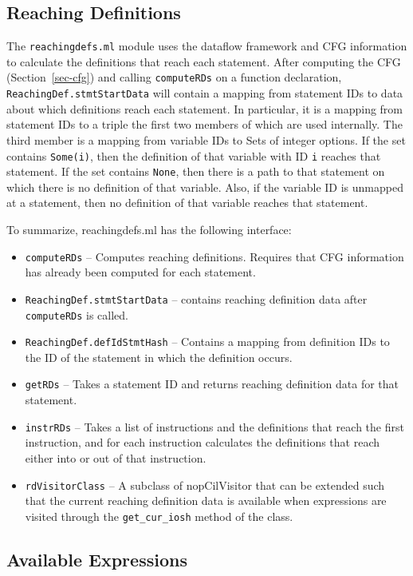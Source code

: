\documentclass{article}
\def\secref#1{Section~\ref{sec-#1}}
\def\t#1{{\tt #1}}
\begin{document}
\subsection{Reaching Definitions}

The \t{reachingdefs.ml} module uses the dataflow framework and CFG
information to calculate the definitions that reach each
statement. After computing the CFG (\secref{cfg}) and calling
\t{computeRDs} on a 
function declaration, \t{ReachingDef.stmtStartData} will contain a
mapping from statement IDs to data about which definitions reach each
statement. In particular, it is a mapping from statement IDs to a
triple the first two members of which are used internally. The third
member is a mapping from variable IDs to Sets of integer options. If
the set contains \t{Some(i)}, then the definition of that variable
with ID \t{i} reaches that statement. If the set contains \t{None},
then there is a path to that statement on which there is no definition
of that variable.  Also, if the variable ID is unmapped at a
statement, then no definition of that variable reaches that statement.

To summarize, reachingdefs.ml has the following interface:
\begin{itemize}
\item \t{computeRDs} -- Computes reaching definitions. Requires that
CFG information has already been computed for each statement.
\item \t{ReachingDef.stmtStartData} -- contains reaching
definition data after \t{computeRDs} is called.
\item \t{ReachingDef.defIdStmtHash} -- Contains a mapping
from definition IDs to the ID of the statement in which
the definition occurs.
\item \t{getRDs} -- Takes a statement ID and returns
reaching definition data for that statement.
\item \t{instrRDs} -- Takes a list of instructions and the
definitions that reach the first instruction, and for
each instruction calculates the definitions that reach
either into or out of that instruction.
\item \t{rdVisitorClass} -- A subclass of nopCilVisitor that
can be extended such that the current reaching definition
data is available when expressions are visited through
the \t{get\_cur\_iosh} method of the class.
\end{itemize}

\subsection{Available Expressions}
\end{document}

